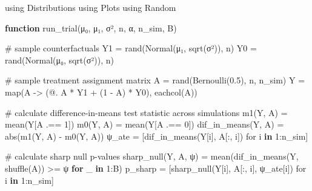 \documentclass[
  11pt,
  letterpaper,
  DIV=11,
  numbers=noendperiod]{scrartcl}
\newenvironment{Shaded}{}{}
\newcommand{\BuiltInTok}[1]{\textcolor[rgb]{0.84,0.36,0.05}{#1}}
\newcommand{\CommentTok}[1]{\textcolor[rgb]{0.57,0.51,0.45}{#1}}
\newcommand{\ControlFlowTok}[1]{\textcolor[rgb]{0.80,0.14,0.11}{\textbf{#1}}}
\newcommand{\FloatTok}[1]{\textcolor[rgb]{0.96,0.45,0.00}{#1}}
\newcommand{\FunctionTok}[1]{\textcolor[rgb]{0.41,0.62,0.42}{#1}}
\newcommand{\ImportTok}[1]{\textcolor[rgb]{0.41,0.62,0.42}{#1}}
\newcommand{\KeywordTok}[1]{\textcolor[rgb]{0.24,0.22,0.21}{\textbf{#1}}}
\newcommand{\NormalTok}[1]{\textcolor[rgb]{0.24,0.22,0.21}{#1}}
\newcommand{\OperatorTok}[1]{\textcolor[rgb]{0.24,0.22,0.21}{#1}}
\begin{document}
\begin{Shaded}
\begin{Highlighting}[]
\ImportTok{using} \BuiltInTok{Distributions}
\ImportTok{using} \BuiltInTok{Plots}
\ImportTok{using} \BuiltInTok{Random}

\KeywordTok{function} \FunctionTok{run\_trial}\NormalTok{(μ₀, μ₁, σ², n, α, n\_sim, B)}

  \CommentTok{\# sample counterfactuals}
\NormalTok{  Y1 }\OperatorTok{=} \FunctionTok{rand}\NormalTok{(}\FunctionTok{Normal}\NormalTok{(μ₁, }\FunctionTok{sqrt}\NormalTok{(σ²)), n)}
\NormalTok{  Y0 }\OperatorTok{=} \FunctionTok{rand}\NormalTok{(}\FunctionTok{Normal}\NormalTok{(μ₀, }\FunctionTok{sqrt}\NormalTok{(σ²)), n)}

  \CommentTok{\# sample treatment assignment matrix}
\NormalTok{  A }\OperatorTok{=} \FunctionTok{rand}\NormalTok{(}\FunctionTok{Bernoulli}\NormalTok{(}\FloatTok{0.5}\NormalTok{), n, n\_sim)}
\NormalTok{  Y }\OperatorTok{=} \FunctionTok{map}\NormalTok{(A }\OperatorTok{{-}\textgreater{}}\NormalTok{ (@. A }\OperatorTok{*}\NormalTok{ Y1 }\OperatorTok{+}\NormalTok{ (}\FloatTok{1} \OperatorTok{{-}}\NormalTok{ A) }\OperatorTok{*}\NormalTok{ Y0), }\FunctionTok{eachcol}\NormalTok{(A))}

  \CommentTok{\# calculate difference{-}in{-}means test statistic across simulations}
  \FunctionTok{m1}\NormalTok{(Y, A) }\OperatorTok{=} \FunctionTok{mean}\NormalTok{(Y[A }\OperatorTok{.==} \FloatTok{1}\NormalTok{]) }
  \FunctionTok{m0}\NormalTok{(Y, A) }\OperatorTok{=} \FunctionTok{mean}\NormalTok{(Y[A }\OperatorTok{.==} \FloatTok{0}\NormalTok{])}
  \FunctionTok{dif\_in\_means}\NormalTok{(Y, A) }\OperatorTok{=} \FunctionTok{abs}\NormalTok{(}\FunctionTok{m1}\NormalTok{(Y, A) }\OperatorTok{{-}} \FunctionTok{m0}\NormalTok{(Y, A))}
\NormalTok{  ψ\_ate }\OperatorTok{=}\NormalTok{ [}\FunctionTok{dif\_in\_means}\NormalTok{(Y[i], A[}\OperatorTok{:}\NormalTok{, i]) for i }\KeywordTok{in} \FloatTok{1}\OperatorTok{:}\NormalTok{n\_sim]}

  \CommentTok{\# calculate sharp null p{-}values}
  \FunctionTok{sharp\_null}\NormalTok{(Y, A, ψ) }\OperatorTok{=} \FunctionTok{mean}\NormalTok{(}\FunctionTok{dif\_in\_means}\NormalTok{(Y, }\FunctionTok{shuffle}\NormalTok{(A)) }\OperatorTok{\textgreater{}=}\NormalTok{ ψ }\ControlFlowTok{for}\NormalTok{ \_ }\KeywordTok{in} \FloatTok{1}\OperatorTok{:}\NormalTok{B)}
\NormalTok{  p\_sharp }\OperatorTok{=}\NormalTok{ [}\FunctionTok{sharp\_null}\NormalTok{(Y[i], A[}\OperatorTok{:}\NormalTok{, i], ψ\_ate[i]) for i }\KeywordTok{in} \FloatTok{1}\OperatorTok{:}\NormalTok{n\_sim]}


\end{Highlighting}
\end{Shaded}
\end{document}
